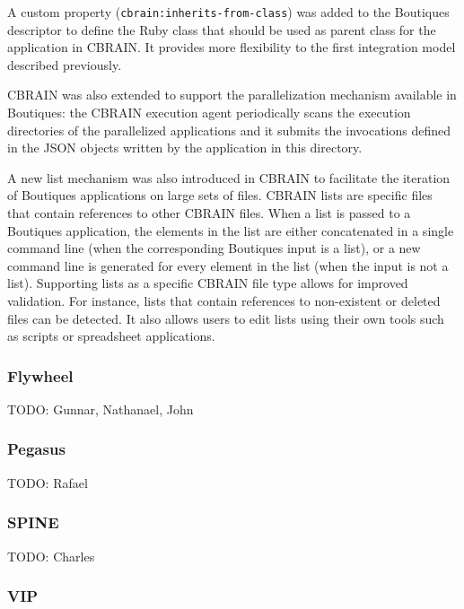\documentclass{article}
\newcommand{\todo}[1]{\color{red}TODO: #1\color{black}}
\newcommand{\boutiques}{Boutiques\xspace}
\begin{document}
A custom property (\texttt{cbrain:inherits-from-class}) was added to
the \boutiques descriptor to define the Ruby class that should be used as
parent class for the application in CBRAIN. It provides more
flexibility to the first integration model described previously.

CBRAIN was also extended to support the parallelization mechanism
available in \boutiques: the CBRAIN execution agent periodically scans
the execution directories of the parallelized applications and it submits
the invocations defined in the JSON objects written by the
application in this directory.

A new list mechanism was also introduced in CBRAIN to facilitate the
iteration of \boutiques applications on large sets of files. CBRAIN
lists are specific files that contain references to other CBRAIN
files. When a list is passed to a \boutiques application, the elements
in the list are either concatenated in a single command line (when the
corresponding \boutiques input is a list), or a new command line is
generated for every element in the list (when the input is not a
list). Supporting lists as a specific CBRAIN file type allows for
improved validation. For instance, lists that contain references to
non-existent or deleted files can be detected. It also allows users to
edit lists using their own tools such as scripts or spreadsheet
applications.

\subsubsection{Flywheel}
\todo{Gunnar, Nathanael, John}

\subsubsection{Pegasus}
\todo{Rafael}

\subsubsection{SPINE}
\todo{Charles}

\subsubsection{VIP}
\end{document}
